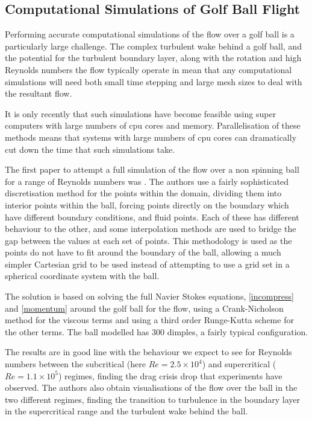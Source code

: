 \subsection{Computational Simulations of Golf Ball Flight}

Performing accurate computational simulations of the flow over a golf ball is a particularly large 
challenge. The complex turbulent wake behind a golf ball, and the potential for the turbulent boundary
layer, along with the rotation and high Reynolds numbers the flow typically operate in mean that any
computational simulations will need both small time stepping and large mesh sizes to deal with the 
resultant flow.

It is only recently that such simulations have become feasible using super computers with large numbers
of cpu cores and memory. Parallelisation of these methods means that systems with large numbers of
cpu cores can dramatically cut down the time that such simulations take.

The first paper to attempt a full simulation of the flow over a non spinning ball for a range of
Reynolds numbers was \citet{Smith2010}. The authors use a fairly sophisticated discretisation method
for the points within the domain, dividing them into interior points within the ball, forcing points
directly on the boundary which have different boundary conditions, and fluid points. Each of these has
different behaviour to the other, and some interpolation methods are used to bridge the gap between
the values at each set of points. This methodology is used as the points do not have to fit around
the boundary of the ball, allowing a much simpler Cartesian grid to be used instead of attempting to
use a grid set in a spherical coordinate system with the ball.

The solution is based on solving the full Navier Stokes equations, \eqref{incompress} and \eqref{momentum}
around the golf ball for the flow, using a Crank-Nicholson method for the viscous terms and using
a third order Runge-Kutta scheme for the other terms. The ball modelled has 300 dimples, a fairly
typical configuration.

The results are in good line with the behaviour we expect to see for Reynolds numbers between the
subcritical (here $Re = 2.5\times10^4$) and supercritical ($Re = 1.1\times10^5$) regimes, finding the 
drag crisis drop that experiments have observed.
The authors also obtain visualisations of the flow over the ball in the two different regimes, finding
the transition to turbulence in the boundary layer in the supercritical range and the turbulent wake 
behind the ball.

